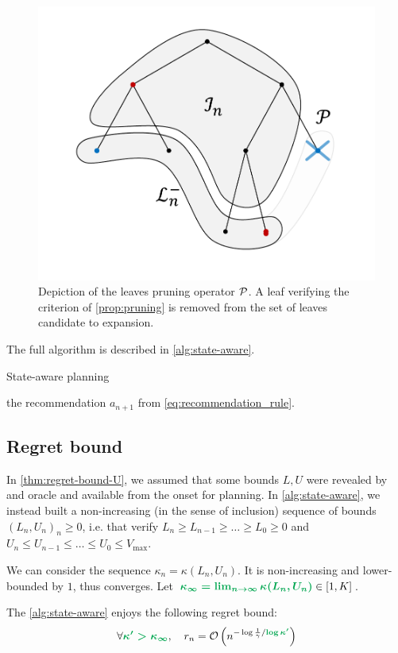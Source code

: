 \documentclass{article}
\begin{document}
\begin{figure}[H]
	\centering
	\includegraphics[trim={1.8cm 1.4cm 1.9cm 1.1cm}, clip, width=0.4\linewidth]{img/tree_4}
	\caption{Depiction of the leaves pruning operator $\mathcal{P}$. A leaf verifying the criterion of \autoref{prop:pruning} is removed from the set of leaves candidate to expansion.}
\end{figure}

The full algorithm is described in \autoref{alg:state-aware}.\\
\begin{algorithm}[H]
	\caption{State-aware planning}
	\label{alg:state-aware}
	\SetAlgoLined\DontPrintSemicolon
	\Return the recommendation $a_{n+1}$ from \eqref{eq:recommendation_rule}.\;
\end{algorithm}

\subsection{Regret bound}

In \autoref{thm:regret-bound-U}, we assumed that some bounds $L,U$ were revealed by and oracle and available from the onset for planning. In \autoref{alg:state-aware}, we instead built a non-increasing (in the sense of inclusion) sequence of bounds $(L_n,U_n)_n\geq 0$, i.e. that verify $L_n\geq L_{n-1}\geq \dots\geq L_0\geq 0$ and $U_n\leq U_{n-1}\leq \dots\leq U_0\leq V_{\max}$.

We can consider the sequence $\kappa_n = \kappa(L_n, U_n)$. It is non-increasing and lower-bounded by $1$, thus converges. Let $\hlgb{\kappa_\infty = \lim_{n\rightarrow\infty} \kappa(L_n, U_n)} \in[1,K]$.
\begin{theorem}
\label{thm:regret-state-aware}
The \autoref{alg:state-aware} enjoys the following regret bound: 
\begin{align*}
\forall \hlgb{\kappa' > \kappa_\infty}, \quad r_n = \cO\left(n^{-\log \frac{1}{\gamma}/\hlgb{\log \kappa'}}\right)
\end{align*}
\end{theorem}
\end{document}

